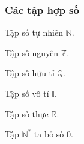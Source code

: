 \subsubsection {Các tập hợp số}
\begin{tcolorbox}[colframe=cyan,colback=white,boxrule=0.2mm]
	\begin{listEX}[3]
		\item [\ding{172}] Tập số tự nhiên $\mathbb{N}$.
		\item [\ding{173}] Tập số nguyên $\mathbb{Z}$.
		\item [\ding{174}] Tập số hữu tỉ $\mathbb{Q}$.
		\item [\ding{175}] Tập số vô tỉ $\mathbb{I}$.
		\item [\ding{176}] Tập số thực $\mathbb{R}$.
		\item [\ding{177}] Tập $\mathbb{N^*}$ ta bỏ số $0$.
	\end{listEX}
\end{tcolorbox}	
